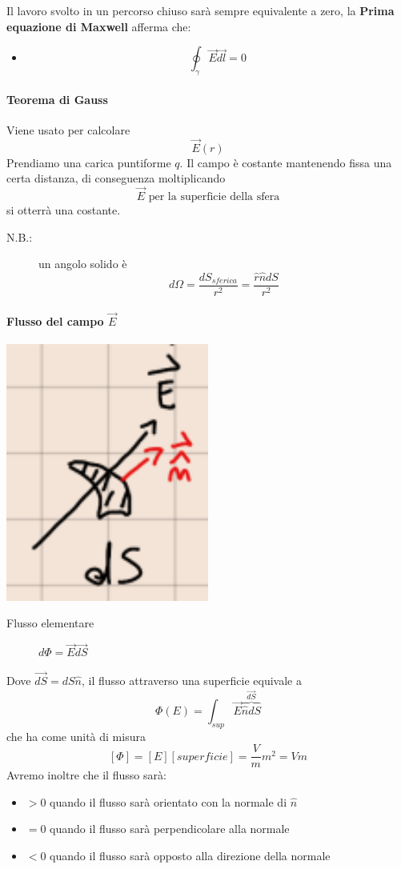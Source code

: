 \documentclass[a4paper, 12pt]{book}
\theoremstyle{plain}
\begin{document}
Il lavoro svolto in un percorso chiuso sarà sempre equivalente a zero, la \textbf{Prima equazione di Maxwell} afferma che:
\begin{itemize}
	\item \[\oint_{\gamma} \vec{E}\vec{dl} = 0 \]
\end{itemize}

\paragraph{Teorema di Gauss}

Viene usato per calcolare \[\vec{E}(r)\] Prendiamo una carica puntiforme $q$. Il campo è costante mantenendo fissa una certa distanza, di conseguenza moltiplicando \[\vec{E}\textrm{ per la superficie della sfera}\] si otterrà una costante.

\begin{description}
	\item[N.B.:] un angolo solido è \[d\Omega = \frac{dS_{sferica}}{r^2} = \frac{\hat{r}\hat{n}dS}{r^2}\]
\end{description}

\paragraph{Flusso del campo $\vec{E}$}

\begin{center}
	\includegraphics[width=0.5\textwidth]{flusso.png}
\end{center}
\begin{description}
	\item[Flusso elementare] $d\Phi = \vec{E}\vec{dS}$
\end{description}
Dove $\vec{dS} = dS\hat{n}$, il flusso attraverso una superficie equivale a \[\Phi(E) = \int_{sup} \vec{E}\overbrace{\hat{n}dS}^{\vec{dS}}\] che ha come unità di misura \[[\Phi] = [E][superficie] = \frac{V}{m}m^2 = Vm\]
Avremo inoltre che il flusso sarà:
\begin{itemize}
	\item $> 0$ quando il flusso sarà orientato con la normale di $\hat{n}$
	\item $= 0$ quando il flusso sarà perpendicolare alla normale
	\item $< 0$ quando il flusso sarà opposto alla direzione della normale
\end{itemize}
\end{document}
